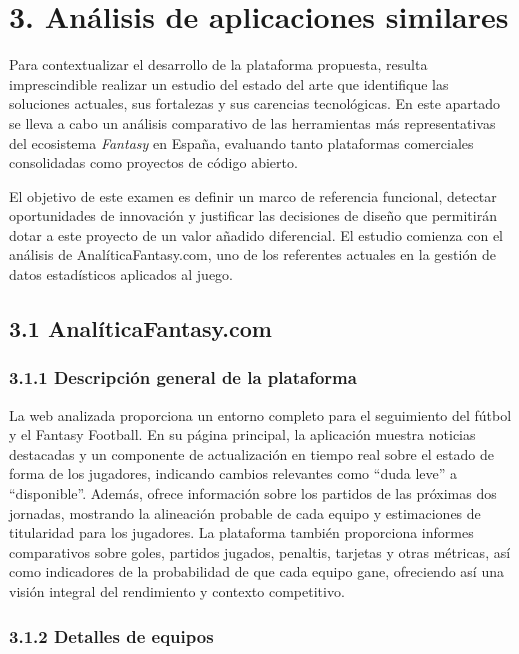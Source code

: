 \section*{3. Análisis de aplicaciones similares}

Para contextualizar el desarrollo de la plataforma propuesta, resulta imprescindible realizar un 
estudio del estado del arte que identifique las soluciones actuales, sus fortalezas y sus carencias
 tecnológicas. En este apartado se lleva a cabo un análisis comparativo de las herramientas más 
 representativas del ecosistema \textit{Fantasy} en España, evaluando tanto plataformas comerciales
  consolidadas como proyectos de código abierto.
  
  El objetivo de este examen es definir un marco de
   referencia funcional, detectar oportunidades de innovación y justificar las decisiones de diseño que 
   permitirán dotar a este proyecto de un valor añadido diferencial. El estudio comienza con el análisis
    de AnalíticaFantasy.com, uno de los referentes actuales en la gestión de datos estadísticos aplicados
     al juego.

\subsection{3.1 AnalíticaFantasy.com}

\subsubsection{3.1.1 Descripción general de la plataforma}

La web analizada proporciona un entorno completo para el seguimiento del fútbol y el 
Fantasy Football. En su página principal, la aplicación muestra noticias destacadas y un componente 
de actualización en tiempo real sobre el estado de forma de los jugadores, indicando cambios 
relevantes como ``duda leve'' a ``disponible''. Además, ofrece información sobre los partidos de las 
próximas dos jornadas, mostrando la alineación probable de cada equipo y estimaciones de titularidad 
para los jugadores. La plataforma también proporciona informes comparativos sobre goles, partidos 
jugados, penaltis, tarjetas y otras métricas, así como indicadores de la probabilidad de que cada 
equipo gane, ofreciendo así una visión integral del rendimiento y contexto competitivo.

\subsubsection{3.1.2 Detalles de equipos}

